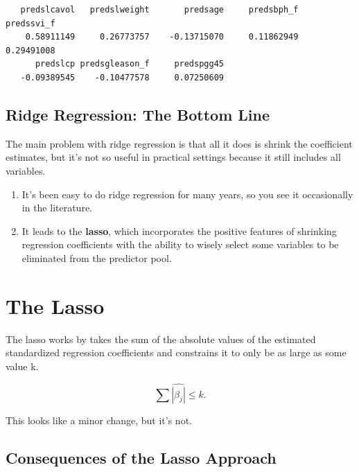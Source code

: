 \documentclass[]{book}
\providecommand{\tightlist}{%
  \setlength{\itemsep}{0pt}\setlength{\parskip}{0pt}}
\theoremstyle{definition}
\theoremstyle{definition}
\theoremstyle{definition}
\theoremstyle{remark}
\begin{document}
\begin{verbatim}
   predslcavol   predslweight       predsage     predsbph_f     predssvi_f 
    0.58911149     0.26773757    -0.13715070     0.11862949     0.29491008 
      predslcp predsgleason_f     predspgg45 
   -0.09389545    -0.10477578     0.07250609 
\end{verbatim}

\subsection{Ridge Regression: The Bottom
Line}\label{ridge-regression-the-bottom-line}

The main problem with ridge regression is that all it does is shrink the
coefficient estimates, but it's not so useful in practical settings
because it still includes all variables.

\begin{enumerate}
\def\labelenumi{\arabic{enumi}.}
\tightlist
\item
  It's been easy to do ridge regression for many years, so you see it
  occasionally in the literature.
\item
  It leads to the \textbf{lasso}, which incorporates the positive
  features of shrinking regression coefficients with the ability to
  wisely select some variables to be eliminated from the predictor pool.
\end{enumerate}

\section{The Lasso}\label{the-lasso}

The lasso works by takes the sum of the absolute values of the estimated
standardized regression coefficients and constrains it to only be as
large as some value k.

\[
\sum \hat{|\beta_j|} \leq k.
\]

This looks like a minor change, but it's not.

\subsection{Consequences of the Lasso
Approach}\label{consequences-of-the-lasso-approach}
\end{document}
